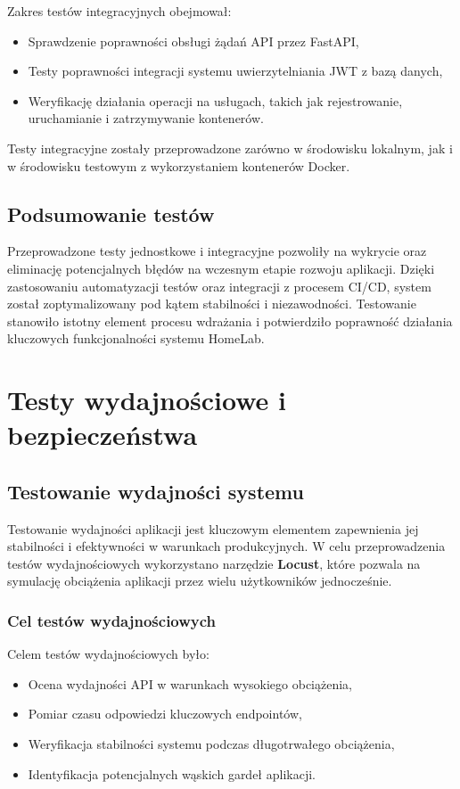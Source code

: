 Zakres testów integracyjnych obejmował:
\begin{itemize}
    \item Sprawdzenie poprawności obsługi żądań API przez FastAPI,
    \item Testy poprawności integracji systemu uwierzytelniania JWT z bazą danych,
    \item Weryfikację działania operacji na usługach, takich jak rejestrowanie, uruchamianie i zatrzymywanie kontenerów.
\end{itemize}

Testy integracyjne zostały przeprowadzone zarówno w środowisku lokalnym, jak i w środowisku testowym z wykorzystaniem kontenerów Docker.

\subsection{Podsumowanie testów}

Przeprowadzone testy jednostkowe i integracyjne pozwoliły na wykrycie oraz eliminację potencjalnych błędów na wczesnym etapie rozwoju aplikacji. Dzięki zastosowaniu automatyzacji testów oraz integracji z procesem CI/CD, system został zoptymalizowany pod kątem stabilności i niezawodności. Testowanie stanowiło istotny element procesu wdrażania i potwierdziło poprawność działania kluczowych funkcjonalności systemu HomeLab.

\section{Testy wydajnościowe i bezpieczeństwa}
\subsection{Testowanie wydajności systemu}

Testowanie wydajności aplikacji jest kluczowym elementem zapewnienia jej stabilności i efektywności w warunkach produkcyjnych. W celu przeprowadzenia testów wydajnościowych wykorzystano narzędzie \textbf{Locust}, które pozwala na symulację obciążenia aplikacji przez wielu użytkowników jednocześnie.

\subsubsection{Cel testów wydajnościowych}
Celem testów wydajnościowych było:
\begin{itemize}
    \item Ocena wydajności API w warunkach wysokiego obciążenia,
    \item Pomiar czasu odpowiedzi kluczowych endpointów,
    \item Weryfikacja stabilności systemu podczas długotrwałego obciążenia,
    \item Identyfikacja potencjalnych wąskich gardeł aplikacji.
\end{itemize}

